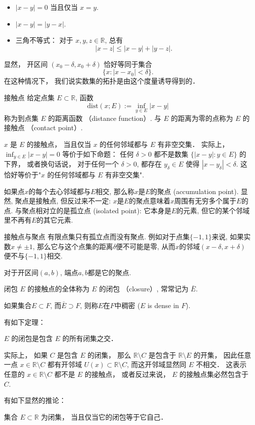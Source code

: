 \begin{itemize}
\item $|x-y|=0$ 当且仅当 $x=y$.
\item $|x-y|=|y-x|$.
\item 三角不等式： 对于 $x,y,z\in\mathbb{R}$, 总有
$$
|x-z|\leq|x-y|+|y-z|.
$$
\end{itemize}

显然， 开区间 $(x_0-\delta,x_0+\delta)$ 恰好等同于集合
$$
\{x:|x-x_0|<\delta\}.
$$
在这种情况下， 我们说实数集的拓扑是由这个度量诱导得到的．

\begin{definition}{接触点}
给定点集 $E\subset\mathbb{R}$, 函数
$$
\text{dist}(x;E):=\inf_{y\in E}|x-y|
$$
称为到点集 $E$ 的距离函数 （distance function）. 与 $E$ 的距离为零的点称为 $E$ 的接触点 （contact point）. 
\end{definition}
$x$ 是 $E$ 的接触点， 当且仅当 $x$ 的任何邻域都与 $E$ 有非空交集． 实际上， $\inf_{y\in E}|x-y|=0$ 等价于如下命题： 任何 $\delta>0$ 都不是数集 $\{|x-y|:y\in E\}$ 的下界， 或者换句话说， 对于任何一个 $\delta>0$, 都存在 $y_\delta\in E$ 使得 $|x-y_\delta|<\delta$. 这恰好等价于"$x$ 的任何邻域都与 $E$ 有非空交集".

如果点$x$的每个去心邻域都与$E$相交, 那么称$x$是$E$的聚点 (accumulation point). 显然, 聚点是接触点, 但反过来不一定: $x$是$E$的聚点意味着$x$周围有无穷多个属于$E$的点. 与聚点相对立的是孤立点 (isolated point): 它本身是$E$的元素, 但它的某个邻域里不再有$E$的其它元素.

\begin{example}{接触点与聚点}
有限点集只有孤立点而没有聚点. 例如对于点集$\{-1,1\}$来说, 如果实数$x\neq\pm1$, 那么它与这个点集的距离$\delta$便不可能是零, 从而$x$的邻域$(x-\delta,x+\delta)$便不与$\{-1,1\}$相交.

对于开区间$(a,b)$, 端点$a,b$都是它的聚点.
\end{example}

\begin{definition}{闭包}
$E$ 的接触点的全体称为 $E$ 的闭包 （closure）, 常常记为 $\bar E$.

如果集合$E\subset F$, 而$\bar E\supset F$, 则称$E$在$F$中稠密 ($E$ is dense in $F$).
\end{definition}

有如下定理：

\begin{theorem}{}
$E$ 的闭包是包含 $E$ 的所有闭集之交．
\end{theorem}
实际上， 如果 $C$ 是包含 $E$ 的闭集， 那么 $\mathbb{R}\setminus C$ 是包含于 $\mathbb{R}\setminus E$ 的开集， 因此任意一点 $x\in\mathbb{R}\setminus C$ 都有开邻域 $U(x)\subset\mathbb{R}\setminus C$, 而这开邻域显然同 $E$ 不相交． 这表示任意的 $x\in\mathbb{R}\setminus C$ 都不是 $E$ 的接触点， 或者反过来说， $E$ 的接触点集必然包含于 $C$. 

有如下显然的推论：
\begin{corollary}{}
集合 $E\subset\mathbb{R}$ 为闭集， 当且仅当它的闭包等于它自己．
\end{corollary}